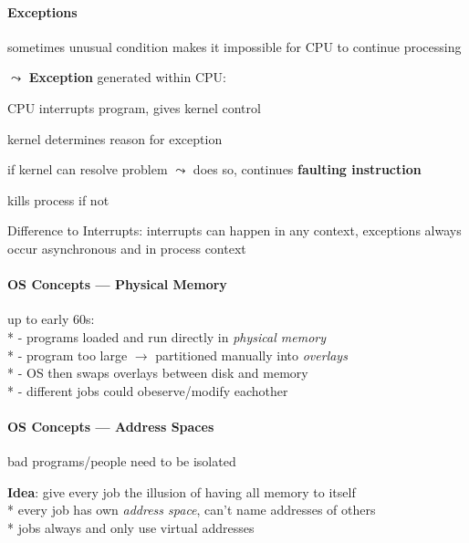\paragraph{Exceptions}
\begin{items}
	\item sometimes unusual condition makes it impossible for CPU to continue processing
	\item \( \leadsto \) \textbf{Exception} generated within CPU:
	\begin{enumeration}
		\item CPU interrupts program, gives kernel control
		\item kernel determines reason for exception
		\item if kernel can resolve problem \( \leadsto \) does so, continues \textbf{faulting instruction}
		\item kills process if not
	\end{enumeration}
	\item Difference to Interrupts: interrupts can happen in any context, exceptions always occur asynchronous and in process context
\end{items}

\paragraph{OS Concepts --- Physical Memory}
\begin{items}
	\item up to early 60s: \\* 
		- programs loaded and run directly in \emph{physical memory}
		\\*
		- program too large \( \to \) partitioned manually into \emph{overlays}
		\\*
		- OS then swaps overlays between disk and memory
		\\*
		- different jobs could obeserve/modify eachother
\end{items}

\paragraph{OS Concepts --- Address Spaces}
\begin{items}
	\item bad programs/people need to be isolated
	\item \textbf{Idea}: give every job the illusion of having all memory to itself
		\\*
		every job has own \emph{address space}, can't name addresses of others
		\\*
		jobs always and only use virtual addresses
\end{items}

